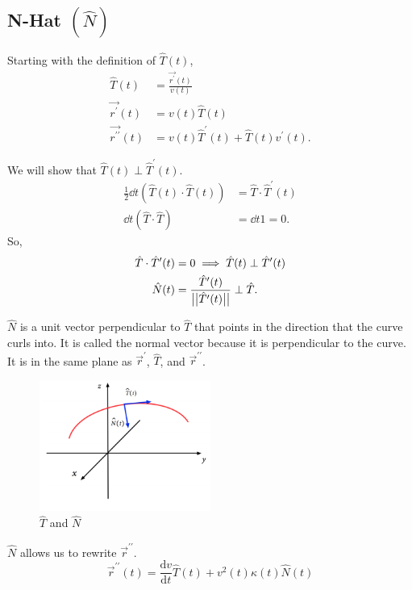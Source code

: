 \subsection{N-Hat $\left(\hat{N}\right)$}
Starting with the definition of $\hat{T}(t)$,
\begin{align*}
	\hat{T}(t) &= \frac{\vec{r^\prime}(t)}{v(t)} \\
	\vec{r^{\prime}}(t) &= v(t)\hat{T}(t) \\
	\vec{r^{\prime\prime}}(t) &= v(t)\hat{T}^{\prime}(t)+\hat{T}(t)v^{\prime}(t).
\end{align*}

\noindent
We will show that $\hat{T}(t) \perp \hat{T}^{\prime}(t)$.
\begin{align*}
	\frac{1}{2}\dd{}{t}\left(\hat{T}(t)\cdot\hat{T}(t)\right) &= \hat{T}\cdot\hat{T}^{\prime}(t) \\
	\dd{}{t}\left(\hat{T}\cdot\hat{T}\right) &= \dd{}{t}1 = 0.
\end{align*}
So,
\begin{align*}
	\hat{T}\cdot\hat{T}^{\prime}(t) &= 0 \implies \hat{T}(t) \perp \hat{T}^{\prime}(t) \\
	\hat{N}(t) &= \frac{\hat{T}^{\prime}(t)}{\big\lvert \big\lvert \hat{T}^{\prime}(t) \big\rvert \big\rvert}\perp\hat{T}.
\end{align*}

\noindent
$\hat{N}$ is a unit vector perpendicular to $\hat{T}$ that points in the direction that the curve curls into.
It is called the normal vector because it is perpendicular to the curve.
It is in the same plane as $\vec{r}^\prime$, $\hat{T}$, and  $\vec{r}^{\prime\prime}$.

\begin{figure}[H]
	\label{that_nhat}
	\centering
	\includegraphics[width = 0.5\textwidth]{./Images/vectorValuedFunctions/TN.PNG}
	\caption{$\hat{T}$ and $\hat{N}$}
\end{figure}

\noindent
$\hat{N}$ allows us to rewrite $\vec{r}^{\prime\prime}$.\\
\begin{equation*}
	\vec{r}^{\prime\prime}(t)=\frac{\mathrm{d}v}{\mathrm{d}t}\hat{T}(t)+v^{2}(t)\kappa(t)\hat{N}(t)
\end{equation*}

